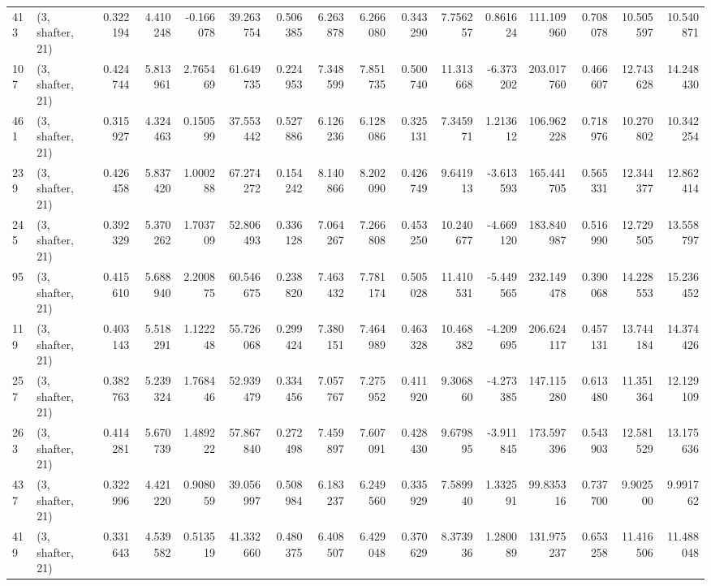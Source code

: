 \begin{tabular}{llrrrrrrrrrrrrrr}
413  &  (3, shafter, 21) &   0.322194 &   4.410248 &  -0.166078 &     39.263754 &    0.506385 &    6.263878 &    6.266080 &  0.343290 &   7.756257 &   0.861624 &   111.109960 &   0.708078 &  10.505597 &  10.540871 \\
107  &  (3, shafter, 21) &   0.424744 &   5.813961 &   2.765469 &     61.649735 &    0.224953 &    7.348599 &    7.851735 &  0.500740 &  11.313668 &  -6.373202 &   203.017760 &   0.466607 &  12.743628 &  14.248430 \\
461  &  (3, shafter, 21) &   0.315927 &   4.324463 &   0.150599 &     37.553442 &    0.527886 &    6.126236 &    6.128086 &  0.325131 &   7.345971 &   1.213612 &   106.962228 &   0.718976 &  10.270802 &  10.342254 \\
239  &  (3, shafter, 21) &   0.426458 &   5.837420 &   1.000288 &     67.274272 &    0.154242 &    8.140866 &    8.202090 &  0.426749 &   9.641913 &  -3.613593 &   165.441705 &   0.565331 &  12.344377 &  12.862414 \\
245  &  (3, shafter, 21) &   0.392329 &   5.370262 &   1.703709 &     52.806493 &    0.336128 &    7.064267 &    7.266808 &  0.453250 &  10.240677 &  -4.669120 &   183.840987 &   0.516990 &  12.729505 &  13.558797 \\
95   &  (3, shafter, 21) &   0.415610 &   5.688940 &   2.200875 &     60.546675 &    0.238820 &    7.463432 &    7.781174 &  0.505028 &  11.410531 &  -5.449565 &   232.149478 &   0.390068 &  14.228553 &  15.236452 \\
119  &  (3, shafter, 21) &   0.403143 &   5.518291 &   1.122248 &     55.726068 &    0.299424 &    7.380151 &    7.464989 &  0.463328 &  10.468382 &  -4.209695 &   206.624117 &   0.457131 &  13.744184 &  14.374426 \\
257  &  (3, shafter, 21) &   0.382763 &   5.239324 &   1.768446 &     52.939479 &    0.334456 &    7.057767 &    7.275952 &  0.411920 &   9.306860 &  -4.273385 &   147.115280 &   0.613480 &  11.351364 &  12.129109 \\
263  &  (3, shafter, 21) &   0.414281 &   5.670739 &   1.489222 &     57.867840 &    0.272498 &    7.459897 &    7.607091 &  0.428430 &   9.679895 &  -3.911845 &   173.597396 &   0.543903 &  12.581529 &  13.175636 \\
437  &  (3, shafter, 21) &   0.322996 &   4.421220 &   0.908059 &     39.056997 &    0.508984 &    6.183237 &    6.249560 &  0.335929 &   7.589940 &   1.332591 &    99.835316 &   0.737700 &   9.902500 &   9.991762 \\
419  &  (3, shafter, 21) &   0.331643 &   4.539582 &   0.513519 &     41.332660 &    0.480375 &    6.408507 &    6.429048 &  0.370629 &   8.373936 &   1.280089 &   131.975237 &   0.653258 &  11.416506 &  11.488048 \\

\end{tabular}
